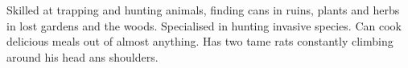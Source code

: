 \begin{npcBox}[title=Gutenberg - a Lost trapper and cook]
    \begin{stressSection}
    \end{stressSection}
    \begin{tabularx}{\textwidth}{ XX }
    \end{tabularx}

    \begin{consequences}
    \item {}
    \item {}
    \item {}
    \end{consequences}

    \begin{npcDescription}
    Skilled at trapping and hunting animals, finding cans in ruins, plants and herbs in lost gardens and the woods. Specialised in hunting invasive species. Can cook delicious meals out of almost anything.
    Has two tame rats constantly climbing around his head ans shoulders.
    \end{npcDescription}

\end{npcBox}


